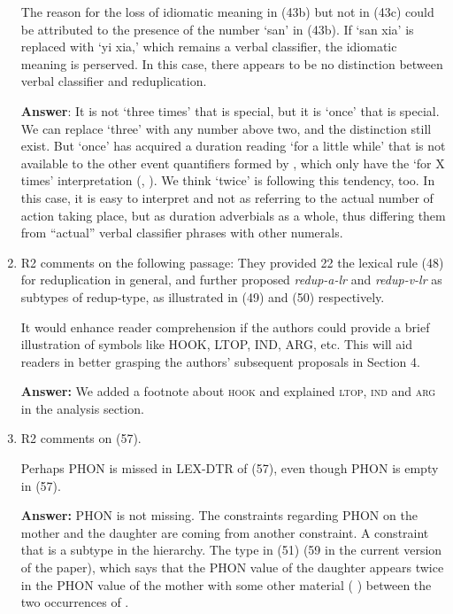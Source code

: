 \documentclass[fleqn,twoside]{article}
\begin{document}
\begin{enumerate}
The reason for the loss of idiomatic meaning in (43b) but not in (43c) could be attributed to the
presence of the number `san' in (43b). If `san xia' is replaced with `yi xia,' which remains a
verbal classifier, the idiomatic meaning is perserved. In this case, there appears to be no
distinction between verbal classifier and reduplication.

\noindent
\textbf{Answer}:
It is not   `three times' that is special, but it is   `once' that is special.
We can replace  `three' with any number above two,
and the distinction still exist.
But   `once' has acquired a duration reading `for a little while' that is not available to the other event quantifiers formed by , which only have the `for X times' interpretation (\citealt[77]{Deng2013}, \citealt[16]{Zhang2000}).
We think   `twice' is following this tendency, too.
In this case, it is easy to interpret   and   not as referring to the actual number of action taking place,
but as duration adverbials as a whole,
thus differing them from ``actual'' verbal classifier phrases with other numerals.

\item
\begin{displayquote}
R2 comments on the following passage: They provided
22 the lexical rule (48) for reduplication in general, and further proposed \textit{redup-a-lr} and \textit{redup-v-lr} as subtypes of redup-type, as illustrated in (49) and (50) respectively.
\end{displayquote}

It would enhance reader comprehension if the authors could provide a brief illustration of symbols
like HOOK, LTOP, IND, ARG, etc. This will aid readers in better grasping the authors' subsequent
proposals in Section 4.

\textbf{Answer:}\label{ltop}
We added a footnote about \textsc{hook} and explained \textsc{ltop}, \textsc{ind} and \textsc{arg}
in the analysis section.

\item
\begin{displayquote}
R2 comments on (57).
\end{displayquote}

Perhaps PHON is missed in LEX-DTR of (57), even though PHON is empty in (57).

\noindent
\textbf{Answer:} PHON is not missing. The constraints regarding PHON on the mother and the daughter are coming from
another constraint. A constraint that is a subtype in the hierarchy. The type
 in (51) (59 in the current version of the paper), which says that the PHON value of the daughter  appears
twice in the PHON value of the mother with some other material ( \etag ) between the two occurrences of .

\end{enumerate}
\end{document}
